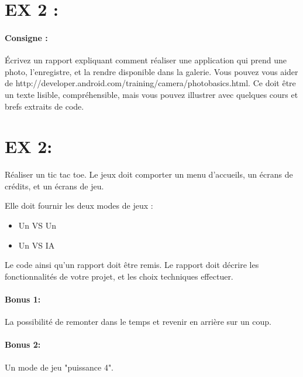 \documentclass{article}
\begin{document}
\section{EX 2 :} 

\paragraph{Consigne : } Écrivez un rapport expliquant comment réaliser une application qui prend une photo, l'enregistre, et la rendre disponible dans la galerie. Vous pouvez vous aider de http://developer.android.com/training/camera/photobasics.html. Ce doit être un texte lisible, compréhensible, mais vous pouvez illustrer avec quelques cours et brefs extraits de code.


\section{EX 2:}
Réaliser un tic tac toe. Le jeux doit comporter un menu d’accueils, un écrans de crédits, et un écrans de jeu.

Elle doit fournir les deux modes de jeux :
\begin{itemize}
\item Un VS Un
\item Un VS IA
\end{itemize}

Le code ainsi qu'un rapport doit être remis. Le rapport doit décrire les fonctionnalités de votre projet, et les choix techniques effectuer.


\paragraph{Bonus 1:} La possibilité de remonter dans le temps et revenir en arrière sur un coup.

\paragraph{Bonus 2:} Un mode de jeu "puissance 4".
\end{document}
